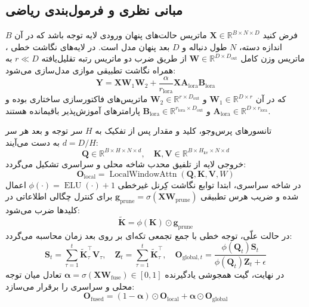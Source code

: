 \subsection{مبانی نظری و فرمول‌بندی ریاضی}
فرض کنید $\mathbf{X} \in \mathbb{R}^{B \times N \times D}$ ماتریس حالت‌های پنهان ورودی لایه توجه باشد که در آن $B$ اندازه دسته، $N$ طول دنباله و $D$ بعد پنهان مدل است. در لایه‌های نگاشت خطی ، ماتریس وزن کامل $\mathbf{W} \in \mathbb{R}^{D \times D_{\text{out}}}$ از طریق ضرب دو ماتریس رتبه تقلیل‌یافته $r \ll D$ به همراه نگاشت تطبیقی موازی مدل‌سازی می‌شود:
\begin{equation}
\mathbf{Y} = \mathbf{X} \mathbf{W}_1 \mathbf{W}_2 + \frac{\alpha}{r_{\text{lora}}} \mathbf{X} \mathbf{A}_{\text{lora}} \mathbf{B}_{\text{lora}}
\end{equation}
که در آن $\mathbf{W}_1 \in \mathbb{R}^{D \times r}$ و $\mathbf{W}_2 \in \mathbb{R}^{r \times D_{\text{out}}}$ ماتریس‌های فاکتورسازی ساختاری بوده و $\mathbf{A}_{\text{lora}} \in \mathbb{R}^{D \times r_{\text{lora}}}$ و $\mathbf{B}_{\text{lora}} \in \mathbb{R}^{r_{\text{lora}} \times D_{\text{out}}}$ پارامترهای آموزش‌پذیر باقیمانده هستند.

تانسورهای پرس‌وجو، کلید و مقدار پس از تفکیک به $H$ سر توجه و بعد هر سر $d = D/H$ به دست می‌آیند:
\begin{equation}
\mathbf{Q} \in \mathbb{R}^{B \times H \times N \times d}, \quad \mathbf{K}, \mathbf{V} \in \mathbb{R}^{B \times H_{\text{kv}} \times N \times d}
\end{equation}
خروجی لایه از تلفیق محدب شاخه محلی و سراسری تشکیل می‌گردد:
\begin{equation}
\mathbf{O}_{\text{local}} = \operatorname{LocalWindowAttn}(\mathbf{Q}, \mathbf{K}, \mathbf{V}, W)
\end{equation}
در شاخه سراسری، ابتدا توابع نگاشت کِرنل غیرخطی $\phi(\cdot) = \operatorname{ELU}(\cdot) + 1$ اعمال شده و ضریب هرس تطبیقی $\mathbf{g}_{\text{prune}} = \sigma(\mathbf{X} \mathbf{W}_{\text{prune}})$ برای کنترل چگالی اطلاعاتی در کلیدها ضرب می‌شود:
\begin{equation}
\tilde{\mathbf{K}} = \phi(\mathbf{K}) \odot \mathbf{g}_{\text{prune}}
\end{equation}
در حالت علّی، توجه خطی با جمع تجمعی تکه‌ای بر روی بعد زمان محاسبه می‌گردد:
\begin{equation}
\mathbf{S}_t = \sum_{\tau=1}^t \tilde{\mathbf{K}}_\tau^\top \mathbf{V}_\tau, \quad \mathbf{Z}_t = \sum_{\tau=1}^t \tilde{\mathbf{K}}_\tau^\top, \quad \mathbf{O}_{\text{global}, t} = \frac{\phi(\mathbf{Q}_t) \mathbf{S}_t}{\phi(\mathbf{Q}_t) \mathbf{Z}_t + \epsilon}
\end{equation}
در نهایت، گیت همجوشی یادگیرنده $\boldsymbol{\alpha} = \sigma(\mathbf{X} \mathbf{W}_{\text{fuse}}) \in [0, 1]$ تعادل میان توجه محلی و سراسری را برقرار می‌سازد:
\begin{equation}
\mathbf{O}_{\text{fused}} = (1 - \boldsymbol{\alpha}) \odot \mathbf{O}_{\text{local}} + \boldsymbol{\alpha} \odot \mathbf{O}_{\text{global}}
\end{equation}

